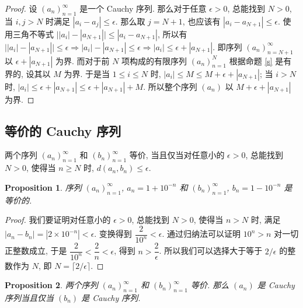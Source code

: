 \documentclass[UTF8]{ctexart}
\theoremstyle{mystyle}
\newtheorem{proposition}{Proposition}[section]
\theoremstyle{myremark}
\theoremstyle{plain}
\begin{document}
\begin{proof}
    设 $ (a_n)_{n = 1}^\infty $ 是一个 Cauchy 序列. 那么对于任意 $ \epsilon > 0 $, 总能找到 $ N > 0 $, 当 $ i, j > N $ 时满足 $ |a_i - a_j| \leqslant \epsilon $. 那么取 $ j = N + 1 $, 也应该有 $ |a_i - a_{N+1}| \leqslant \epsilon $. 使用三角不等式 $ \big||a_i| - |a_{N+1}|\big| \leqslant |a_i - a_{N+1}| $, 所以有 $ \big||a_i| - |a_{N+1}|\big| \leqslant \epsilon \Longrightarrow  |a_i| - |a_{N+1}| \leqslant \epsilon \Longrightarrow |a_i| \leqslant \epsilon + |a_{N+1}| $. 即序列 $ (a_n)_{n = N+1}^\infty $ 以 $ \epsilon + |a_{N+1}| $ 为界. 而对于前 $ N $ 项构成的有限序列 $ (a_n)_{n = 1}^N $ 根据命题 \ref{s} 是有界的, 设其以 $ M $ 为界. 于是当 $ 1 \leqslant i \leqslant N $ 时, $ |a_i| \leqslant M \leqslant M + \epsilon + |a_{N+1}| $; 当 $ i > N $ 时, $ |a_i| \leqslant \epsilon + |a_{N+1}| \leqslant \epsilon + |a_{N+1}| + M $. 所以整个序列 $ (a_n) $ 以 $ M + \epsilon + |a_{N+1}| $ 为界.
\end{proof}


\subsection{等价的 Cauchy 序列}
\begin{definition}
    两个序列 $ (a_n)_{n = 1}^\infty $ 和 $ (b_n)_{n = 1}^\infty $ 等价, 当且仅当对任意小的 $ \epsilon > 0 $, 总能找到 $ N > 0 $, 使得当 $ n \geqslant N $ 时, $ d(a_n, b_n) \leqslant \epsilon $.
\end{definition}

\begin{proposition}
    序列 $ (a_n)_{n = 1}^\infty $, $ a_n = 1 + 10^{-n} $ 和 $ (b_n)_{n = 1}^\infty $, $ b_n = 1 - 10^{-n} $ 是等价的.
\end{proposition}

\begin{doublespace}
    \begin{proof}
        我们要证明对任意小的 $ \epsilon > 0 $, 总能找到 $ N > 0 $, 使得当 $ n > N $ 时, 满足 $ |a_n - b_n| = |2 \times 10^{-n}| < \epsilon $. 变换得到 $ \dfrac{2}{10^n} < \epsilon $. 通过归纳法可以证明 $ 10^n > n $ 对一切正整数成立, 于是 $ \dfrac{2}{10^n} < \dfrac{2}{n} < \epsilon $, 得到 $ n > \dfrac{2}{\epsilon} $. 所以我们可以选择大于等于 $ 2/\epsilon $ 的整数作为 $ N $, 即 $ N = \lceil {2}/{\epsilon} \rceil $.
    \end{proof}
\end{doublespace}

\begin{proposition}
    两个序列 $ (a_n)_{n = 1}^\infty $ 和 $ (b_n)_{n = 1}^\infty $ 等价. 那么 $ (a_n) $ 是 Cauchy 序列当且仅当 $ (b_n) $ 是 Cauchy 序列.
\end{proposition}
\end{document}
